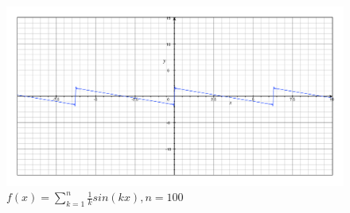 \begin{figure}[p] %
   \centering
   \includegraphics[width=0.4\textheight]{Uebung2/Aufgabe_2_2_c.pdf} 
   \caption{$f(x)=\sum_{k=1}^n \frac{1}{k}sin(kx), n=100$}
   \label{fig:2.2.c}
\end{figure}

